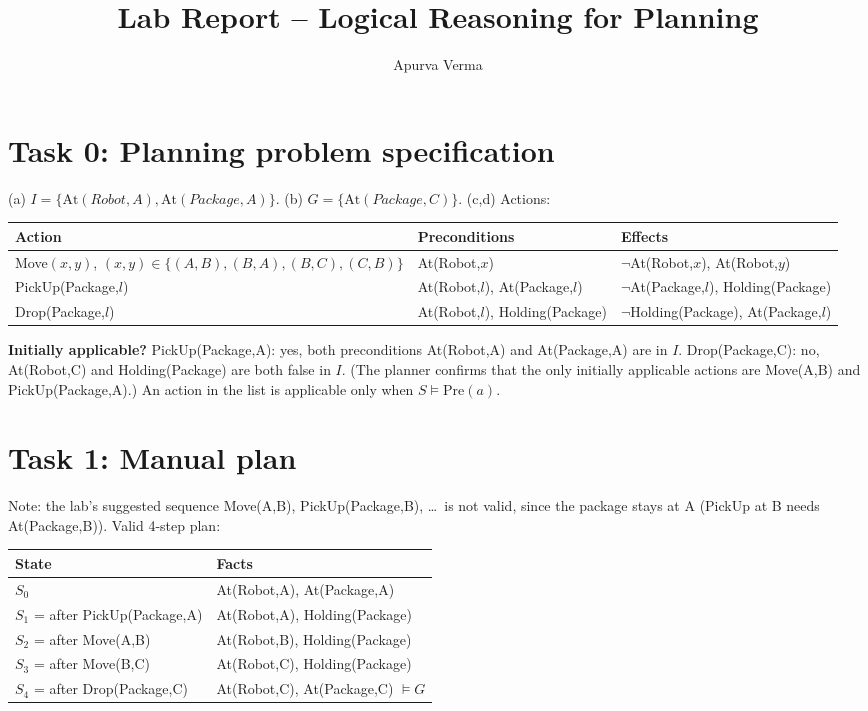 \documentclass[10pt,a4paper]{article}
\title{Lab Report -- Logical Reasoning for Planning}
\author{Apurva Verma}\date{}
\begin{document}
\maketitle

\section*{Task 0: Planning problem specification}
(a) $I=\{\mathrm{At}(Robot,A),\mathrm{At}(Package,A)\}$. (b) $G=\{\mathrm{At}(Package,C)\}$.
(c,d) Actions:
\begin{center}\begin{tabular}{lll}\toprule Action & Preconditions & Effects\\\midrule
Move$(x,y)$, $(x,y)\in\{(A,B),(B,A),(B,C),(C,B)\}$ & At(Robot,$x$) & $\neg$At(Robot,$x$), At(Robot,$y$)\\
PickUp(Package,$l$) & At(Robot,$l$), At(Package,$l$) & $\neg$At(Package,$l$), Holding(Package)\\
Drop(Package,$l$) & At(Robot,$l$), Holding(Package) & $\neg$Holding(Package), At(Package,$l$)\\\bottomrule\end{tabular}\end{center}
\textbf{Initially applicable?} PickUp(Package,A): yes, both preconditions At(Robot,A) and At(Package,A) are in $I$. Drop(Package,C): no, At(Robot,C) and Holding(Package) are both false in $I$. (The planner confirms that the only initially applicable actions are Move(A,B) and PickUp(Package,A).) An action in the list is applicable only when $S\models \mathrm{Pre}(a)$.

\section*{Task 1: Manual plan}
Note: the lab's suggested sequence Move(A,B), PickUp(Package,B), \dots\ is not valid, since the package stays at A (PickUp at B needs At(Package,B)). Valid 4-step plan:
\begin{center}\begin{tabular}{ll}\toprule State & Facts\\\midrule
$S_0$ & At(Robot,A), At(Package,A)\\
$S_1$ = after PickUp(Package,A) & At(Robot,A), Holding(Package)\\
$S_2$ = after Move(A,B) & At(Robot,B), Holding(Package)\\
$S_3$ = after Move(B,C) & At(Robot,C), Holding(Package)\\
$S_4$ = after Drop(Package,C) & At(Robot,C), At(Package,C) $\models G$\\\bottomrule\end{tabular}\end{center}
\end{document}

